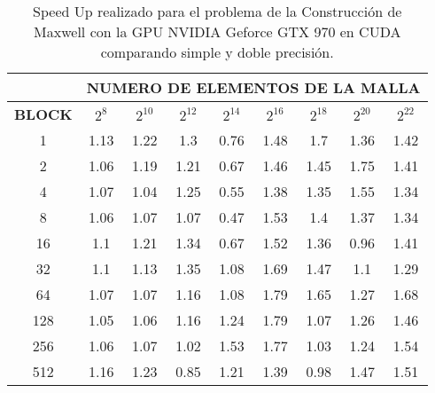 \begin{table}[h!]
    \begin{tabular}{|c|c|c|c|c|c|c|c|c|}
    \hline
                   & \multicolumn{8}{c|}{\textbf{NUMERO DE ELEMENTOS DE LA MALLA}} \\ \hline
    \textbf{BLOCK} & $2^8$ & $2^10$& $2^12$& $2^14$& $2^16$& $2^18$& $2^20$& $2^22$\\ \hline
    1              & 1.13  & 1.22  & 1.3   & 0.76  & 1.48  & 1.7   & 1.36  & 1.42  \\ \hline
    2              & 1.06  & 1.19  & 1.21  & 0.67  & 1.46  & 1.45  & 1.75  & 1.41  \\ \hline
    4              & 1.07  & 1.04  & 1.25  & 0.55  & 1.38  & 1.35  & 1.55  & 1.34  \\ \hline
    8              & 1.06  & 1.07  & 1.07  & 0.47  & 1.53  & 1.4   & 1.37  & 1.34  \\ \hline
    16             & 1.1   & 1.21  & 1.34  & 0.67  & 1.52  & 1.36  & 0.96  & 1.41  \\ \hline
    32             & 1.1   & 1.13  & 1.35  & 1.08  & 1.69  & 1.47  & 1.1   & 1.29  \\ \hline
    64             & 1.07  & 1.07  & 1.16  & 1.08  & 1.79  & 1.65  & 1.27  & 1.68  \\ \hline
    128            & 1.05  & 1.06  & 1.16  & 1.24  & 1.79  & 1.07  & 1.26  & 1.46  \\ \hline
    256            & 1.06  & 1.07  & 1.02  & 1.53  & 1.77  & 1.03  & 1.24  & 1.54  \\ \hline
    512            & 1.16  & 1.23  & 0.85  & 1.21  & 1.39  & 0.98  & 1.47  & 1.51  \\ \hline
    \end{tabular}
    \caption{Speed Up realizado para el problema de la Construcción de Maxwell con la GPU NVIDIA Geforce GTX 970 en CUDA comparando simple y doble precisión.}
    \label{tab:c_970_MxC_cuda_10}
    \end{table}